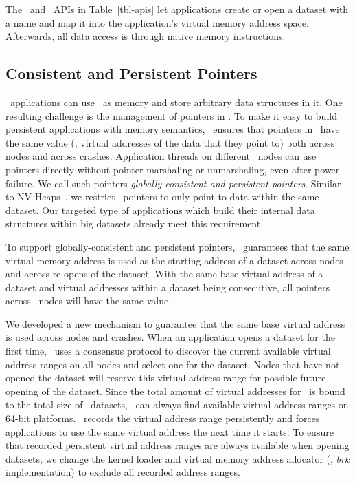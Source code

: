 The \open\ and \mmap\ APIs in Table~\ref{tbl-apis} let applications create or open a dataset with a name and 
map it into the application's virtual memory address space.
Afterwards, all data access is through native memory instructions.



\subsection{Consistent and Persistent Pointers} 
\label{sec:hotpot:addressing}

\hotpot\ applications can use \dsnvm\ as memory and store arbitrary data structures in it. 
One resulting challenge is the management of pointers in \dsnvm.
To make it easy to build persistent applications with memory semantics, 
\hotpot\ ensures that pointers in \dsnvm\ have the same value (\ie, virtual addresses of the data that they point to) 
both across nodes and across crashes. 
Application threads on different \hotpot\ nodes can use pointers directly without pointer marshaling or unmarshaling,
even after power failure.
We call such pointers {\em globally-consistent and persistent pointers}.
Similar to NV-Heaps~\cite{Coburn11-ASPLOS}, we restrict \dsnvm\ pointers to only point to data within the same dataset. 
Our targeted type of applications which build their internal data structures within big datasets already meet this requirement.

To support globally-consistent and persistent pointers, 
\hotpot\ guarantees that the same virtual memory address is used as the starting address of a dataset across nodes and across re-opens of the dataset.
With the same base virtual address of a dataset and virtual addresses within a dataset being consecutive, 
all pointers across \hotpot\ nodes will have the same value. 

We developed a new mechanism to guarantee that the same base virtual address is used across nodes and crashes.
When an application opens a dataset for the first time, \hotpot\ uses a consensus protocol to discover the current 
available virtual address ranges on all nodes and select one for the dataset. 
Nodes that have not opened the dataset will reserve this virtual address range for possible future opening of the dataset.
Since the total amount of virtual addresses for \dsnvm\ is bound to the total size of \dsnvm\ datasets, 
\hotpot\ can always find available virtual address ranges on 64-bit platforms.
\hotpot\ records the virtual address range persistently and forces applications to use the same virtual address 
the next time it starts.
To ensure that recorded persistent virtual address ranges are always available when opening datasets, 
we change the kernel loader and virtual memory address allocator (\ie, {\it brk} implementation) to exclude 
all recorded address ranges.
